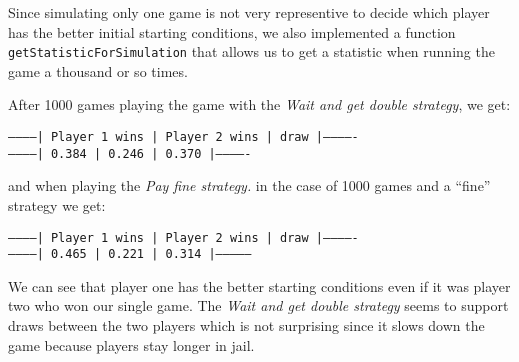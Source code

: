 Since simulating only one game is not very representive to decide which 
player has the better initial starting conditions, we also implemented 
a function \lstinline|getStatisticForSimulation| that allows us to get a statistic 
when running the game a thousand or so times. 

After 1000 games playing the game with the \emph{Wait and get double strategy}, we 
get:

\vspace{1\baselineskip}

\begin{center}
  \texttt{------------| Player 1 wins | Player 2 wins | draw  |-------------\\
------------|  0.384        | 0.246         | 0.370 |-------------}
\end{center}

\vspace{1\baselineskip}

and when playing the \emph{Pay fine strategy.} in the case of 1000 games and a \enquote{fine} strategy
we get:

\vspace{1\baselineskip}

\begin{center}
  \texttt{------------| Player 1 wins | Player 2 wins | draw  |-------------\\
------------| 0.465          | 0.221        | 0.314 |--------------}
\end{center}

\vspace{1\baselineskip}

We can see that player one has the better starting conditions even if it was player two who
won our single game. The \emph{Wait and get double strategy} seems to support draws between the
two players which is not surprising since it slows down the game because players stay longer in jail.



